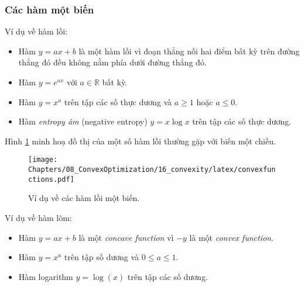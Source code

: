 \subsubsection{Các hàm một biến}
Ví dụ về hàm lồi:
\begin{itemize}
    \item Hàm $ y = ax + b$ là một {hàm lồi} vì đoạn thẳng nối hai điểm
    bất kỳ trên đường thẳng đó đều {không nằm phía dưới} đường thẳng đó. 
     
    \item Hàm $y = e^{ax}$ với $a \in \mathbb{R}$ bất kỳ. 
     
    \item Hàm $y = x^a$ trên tập các số thực dương và $a \geq 1$ hoặc $a \leq 0$. 
     
    \item Hàm \textit{entropy âm} (negative entropy) $y = x \log x$ trên tập các số thực dương. 

\end{itemize}
 
Hình \ref{fig:16_convexfunctions} minh hoạ đồ thị của một số hàm lồi thường
gặp với biến một chiều.

\begin{figure}[t]
\myrule
\vspace{3mm}
\centering
    \texttt{[image: Chapters/08\_ConvexOptimization/16\_convexity/latex/convexfunctions.pdf]}
    \caption[]{Ví dụ về các hàm lồi một biến.}
    \label{fig:16_convexfunctions}
    \captionsetup[figure]{format=rule, justification=centering}
\end{figure}
 
Ví dụ về hàm lõm:
\begin{itemize}
    \item Hàm $y = ax + b$ là một \textit{concave function} vì $-y$ là một \textit{convex function}. 
     
    \item Hàm $y = x^a$ trên tập số dương và $0 \leq a \leq 1$. 
     
\item Hàm logarithm $y = \log(x)$ trên tập các số dương. 
\end{itemize}
 
